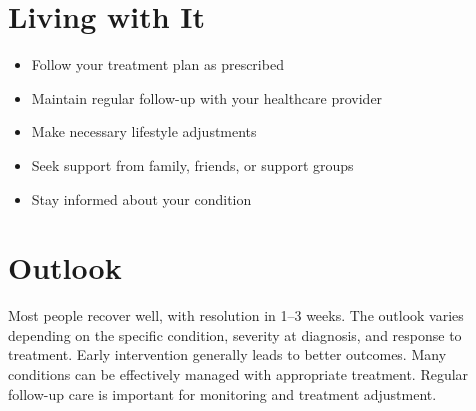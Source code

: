 \section{Living with It}
\begin{itemize}[noitemsep]
  \item Follow your treatment plan as prescribed
  \item Maintain regular follow-up with your healthcare provider
  \item Make necessary lifestyle adjustments
  \item Seek support from family, friends, or support groups
  \item Stay informed about your condition
\end{itemize}
\section{Outlook}
Most people recover well, with resolution in 1--3 weeks. The outlook varies depending on the specific condition, severity at diagnosis, and response to treatment. Early intervention generally leads to better outcomes. Many conditions can be effectively managed with appropriate treatment. Regular follow-up care is important for monitoring and treatment adjustment.
